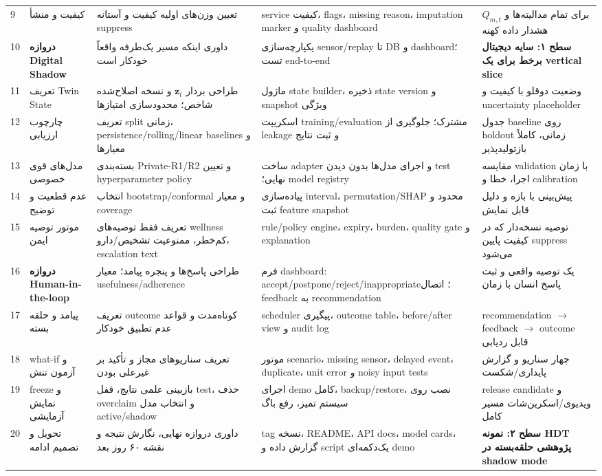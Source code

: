\documentclass[11pt,a4paper]{article}
\begin{document}
\begin{landscape}
\begin{longtable}{p{}p{}p{}p{}p{}}
9 & کیفیت و منشأ & تعیین وزن‌های اولیه کیفیت و آستانه suppress & service کیفیت، flags، missing reason، imputation marker و quality dashboard & $Q_{m,t}$ برای تمام مدالیته‌ها و هشدار داده کهنه\\
10 & \textbf{دروازه Digital Shadow} & داوری اینکه مسیر یک‌طرفه واقعاً خودکار است & یکپارچه‌سازی sensor/replay تا DB و dashboard؛ تست end-to-end & \textbf{سطح ۱: سایه دیجیتال برخط برای یک vertical slice}\\
11 & تعریف Twin State & طراحی بردار $\mathbf z_t$ و نسخه اصلاح‌شده شاخص؛ محدودسازی امتیازها & ماژول state builder، ذخیره state version و snapshot ویژگی & وضعیت دوقلو با کیفیت و uncertainty placeholder\\
12 & چارچوب ارزیابی & تعریف split زمانی، persistence/rolling/linear baselines و معیارها & اسکریپت training/evaluation مشترک؛ جلوگیری از leakage و ثبت نتایج & جدول baseline روی holdout زمانی، کاملاً بازتولیدپذیر\\
13 & مدل‌های قوی خصوصی & بسته‌بندی Private-R1/R2 و تعیین hyperparameter policy & ساخت adapter و اجرای مدل‌ها بدون دیدن test نهایی؛ model registry & مقایسه validation با زمان اجرا، خطا و calibration\\
14 & عدم قطعیت و توضیح & انتخاب bootstrap/conformal و معیار coverage & پیاده‌سازی interval، permutation/SHAP محدود و ثبت feature snapshot & پیش‌بینی با بازه و دلیل قابل نمایش\\
15 & موتور توصیه ایمن & تعریف فقط توصیه‌های wellness کم‌خطر، ممنوعیت تشخیص/دارو، escalation text & rule/policy engine، expiry، burden، quality gate و explanation & توصیه نسخه‌دار که در کیفیت پایین suppress می‌شود\\
16 & \textbf{دروازه Human-in-the-loop} & طراحی پاسخ‌ها و پنجره پیامد؛ معیار usefulness/adherence & فرم dashboard: accept/postpone/reject/inappropriate؛ اتصال feedback به recommendation & یک توصیه واقعی و ثبت پاسخ انسان با زمان\\
17 & پیامد و حلقه بسته & تعریف outcome کوتاه‌مدت و قواعد عدم تطبیق خودکار & scheduler پیگیری، outcome table، before/after view و audit log & recommendation $\rightarrow$ feedback $\rightarrow$ outcome قابل ردیابی\\
18 & what-if و آزمون تنش & تعریف سناریوهای مجاز و تأکید بر غیرعلی بودن & موتور scenario، missing sensor، delayed event، duplicate، unit error و noisy input tests & چهار سناریو و گزارش پایداری/شکست\\
19 & freeze و نمایش آزمایشی & بازبینی علمی نتایج، قفل test، حذف overclaim و انتخاب مدل active/shadow & اجرای demo کامل، backup/restore، نصب روی سیستم تمیز، رفع باگ & release candidate و ویدیوی/اسکرین‌شات مسیر کامل\\
20 & تحویل و تصمیم ادامه & داوری دروازه نهایی، نگارش نتیجه و نقشه ۶۰ روز بعد & tag نسخه، README، API docs، model cards، گزارش داده و script یک‌دکمه‌ای demo & \textbf{سطح ۲: نمونه HDT پژوهشی حلقه‌بسته در shadow mode}\\
\bottomrule
\end{longtable}
\normalsize
\end{landscape}
\end{document}
